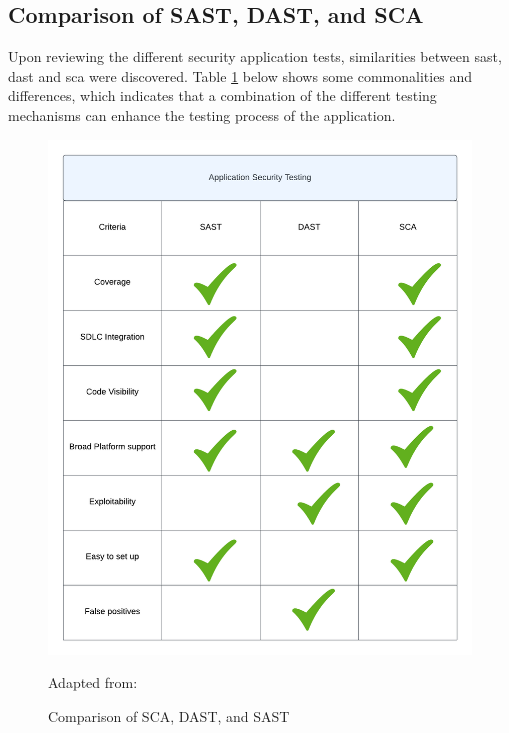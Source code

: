 \newpage
\subsection{Comparison of SAST, DAST, and SCA}
Upon reviewing the different security application tests, similarities between \acrshort{sast}, \acrshort{dast} and \acrshort{sca} were discovered. Table \ref{fig: Comparison of SCA, DAST, and SASt} below shows some commonalities and differences, which indicates that a combination of the different testing mechanisms can enhance the testing process of the application. 

\vspace{2mm}
\begin{figure}[H]
    \centering
    \includegraphics[width=0.8\columnwidth]{Images/ApplicationSecurityTesting.png}
    \caption{Comparison of SCA, DAST, and SAST}Adapted from: \cite{Comparison}
    \label{fig: Comparison of SCA, DAST, and SASt}
\end{figure}

